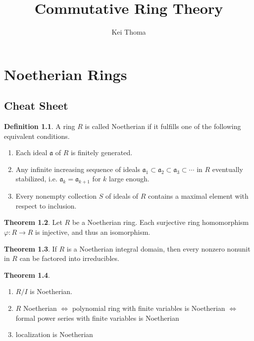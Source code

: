 \documentclass[a4paper]{book}
\title{Commutative Ring Theory}
\author{Kei Thoma}
\theoremstyle{definition}
\newtheorem{definition}{Definition}[]
\newtheorem{theorem}[definition]{Theorem}
\begin{document}
\chapter{Noetherian Rings}
\section*{Cheat Sheet}
\begin{defbox}
    \begin{definition}
        A ring \(R\) is called Noetherian if it fulfills one of the following equivalent conditions.
        \begin{enumerate}
            \item Each ideal \(\mathfrak{a}\) of \(R\) is finitely generated.
            \item Any infinite increasing sequence of ideals \(\mathfrak{a}_1 \subset \mathfrak{a}_2 \subset \mathfrak{a}_3 \subset \cdots\) in \(R\) eventually stabilized, i.e. \(\mathfrak{a}_k = \mathfrak{a}_{k + 1}\) for \(k\) large enough.
            \item Every nonempty collection \(S\) of ideals of \(R\) contains a maximal element with respect to inclusion.
        \end{enumerate}
    \end{definition}
\end{defbox}





\begin{thmbox}
    \begin{theorem}
        Let \(R\) be a Noetherian ring. Each surjective ring homomorphism \(\varphi: R \longrightarrow R\) is injective, and thus an isomorphism.
    \end{theorem}
\end{thmbox}





\begin{thmbox}
    \begin{theorem}
        If \(R\) is a Noetherian integral domain, then every nonzero nonunit in \(R\) can be factored into irreducibles.
    \end{theorem}
\end{thmbox}

\begin{thmbox}
    \begin{theorem}
        \begin{enumerate}
            \item \(R / I\) is Noetherian.
            \item \(R\) Noetherian \(\iff\) polynomial ring with finite variables is Noetherian \(\iff\) formal power series with finite variables is Noetherian
            \item localization is Noetherian
        \end{enumerate}
    \end{theorem}
\end{thmbox}
\end{document}

